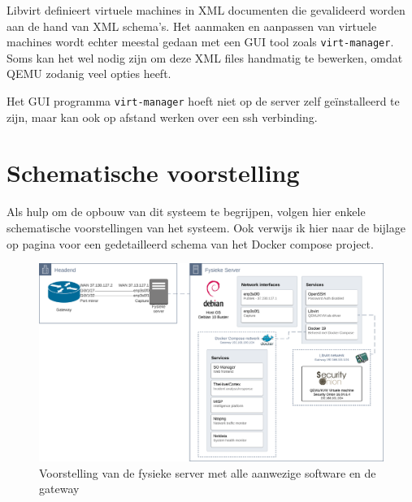 \documentclass[a4paper,12pt]{report}
\begin{document}
Libvirt definieert virtuele machines in XML documenten die gevalideerd worden aan de hand van XML schema's.
Het aanmaken en aanpassen van virtuele machines wordt echter meestal gedaan met een GUI tool zoals \lstinline|virt-manager|.
Soms kan het wel nodig zijn om deze XML files handmatig te bewerken, omdat QEMU zodanig veel opties heeft.
\autocite{libvirt:docs}

Het GUI programma \lstinline|virt-manager| hoeft niet op de server zelf geïnstalleerd te zijn, maar kan ook op afstand werken over een ssh verbinding.


\section{Schematische voorstelling}
Als hulp om de opbouw van dit systeem te begrijpen, volgen hier enkele schematische voorstellingen van het systeem.
Ook verwijs ik hier naar de bijlage op pagina \pageref{bijlage:aangepast-systeem-schema-docker} voor een gedetailleerd schema van het Docker compose project.

\begin{figure}[H]
  \centering
  \includegraphics[width=\textwidth]{aangepast-systeem-schema-server}
  \caption{Voorstelling van de fysieke server met alle aanwezige software en de gateway}
  \label{fig:aangepast-systeem-schema-server}
\end{figure}
\end{document}
